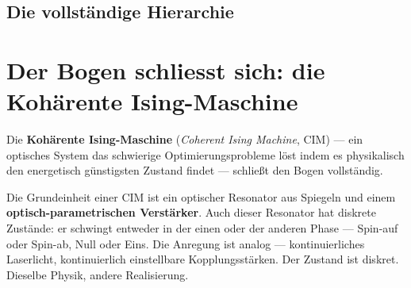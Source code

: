 \subsection{Die vollständige Hierarchie}

\begin{center}
\end{center}

\section{Der Bogen schliesst sich: die Kohärente Ising-Maschine}
\label{sec:ising}

Die \textbf{Kohärente Ising-Maschine}
(\textit{Coherent Ising Machine}, CIM) ---
ein optisches System das schwierige Optimierungsprobleme
löst indem es physikalisch den energetisch günstigsten Zustand findet
--- schließt den Bogen vollständig.

Die Grundeinheit einer CIM ist ein optischer Resonator
aus Spiegeln und einem \textbf{optisch-parametrischen Verstärker}.
Auch dieser Resonator hat diskrete Zustände:
er schwingt entweder in der einen oder der anderen Phase ---
Spin-auf oder Spin-ab, Null oder Eins.
Die Anregung ist analog --- kontinuierliches Laserlicht,
kontinuierlich einstellbare Kopplungsstärken.
Der Zustand ist diskret. Dieselbe Physik, andere Realisierung.

